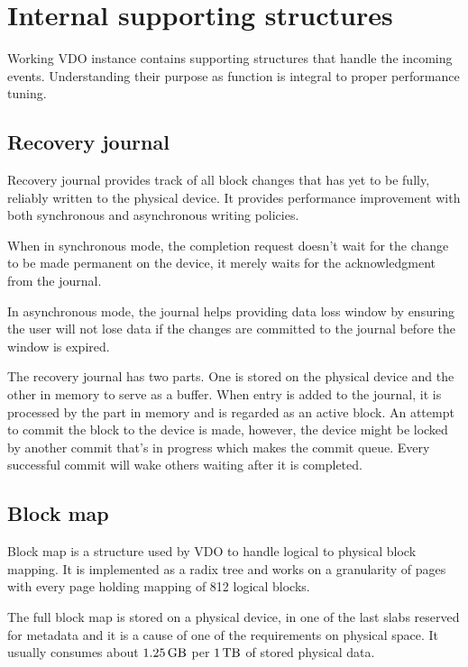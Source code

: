 \documentclass[
  color, %
  table, %
  lof,   %
  lot,   %
]{fithesis3}
\begin{document}

\section{Internal supporting structures}
Working VDO instance contains supporting structures that handle the incoming events. Understanding their purpose as function is integral to proper performance tuning.


\subsection{Recovery journal}
Recovery journal provides track of all block changes that has yet to be fully, reliably written to the physical device. It provides performance improvement with both synchronous and asynchronous writing policies.

When in synchronous mode, the completion request doesn't wait for the change to be made permanent on the device, it merely waits for the acknowledgment from the journal.

In asynchronous mode, the journal helps providing data loss window by ensuring the user will not lose data if the changes are committed to the journal before the window is expired.

The recovery journal has two parts. One is stored on the physical device and the other in memory to serve as a buffer. When entry is added to the journal, it is processed by the part in memory and is regarded as an active block. An attempt to commit the block to the device is made, however, the device might be locked by another commit that's in progress which makes the commit queue. Every successful commit will wake others waiting after it is completed.


\subsection{Block map}
Block map is a structure used by VDO to handle logical to physical block mapping. It is implemented as a radix tree and works on a granularity of pages with every page holding mapping of 812 logical blocks.

The full block map is stored on a physical device, in one of the last slabs reserved for metadata and it is a cause of one of the requirements on physical space. It usually consumes about $\SI{1,25}{\giga\byte}$ per $\SI{1}{\tera\byte}$ of stored physical data.
\end{document}
